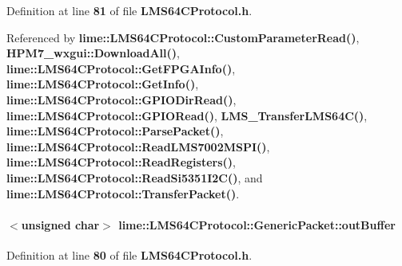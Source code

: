 Definition at line {\bf 81} of file {\bf L\+M\+S64\+C\+Protocol.\+h}.



Referenced by {\bf lime\+::\+L\+M\+S64\+C\+Protocol\+::\+Custom\+Parameter\+Read()}, {\bf H\+P\+M7\+\_\+wxgui\+::\+Download\+All()}, {\bf lime\+::\+L\+M\+S64\+C\+Protocol\+::\+Get\+F\+P\+G\+A\+Info()}, {\bf lime\+::\+L\+M\+S64\+C\+Protocol\+::\+Get\+Info()}, {\bf lime\+::\+L\+M\+S64\+C\+Protocol\+::\+G\+P\+I\+O\+Dir\+Read()}, {\bf lime\+::\+L\+M\+S64\+C\+Protocol\+::\+G\+P\+I\+O\+Read()}, {\bf L\+M\+S\+\_\+\+Transfer\+L\+M\+S64\+C()}, {\bf lime\+::\+L\+M\+S64\+C\+Protocol\+::\+Parse\+Packet()}, {\bf lime\+::\+L\+M\+S64\+C\+Protocol\+::\+Read\+L\+M\+S7002\+M\+S\+P\+I()}, {\bf lime\+::\+L\+M\+S64\+C\+Protocol\+::\+Read\+Registers()}, {\bf lime\+::\+L\+M\+S64\+C\+Protocol\+::\+Read\+Si5351\+I2\+C()}, and {\bf lime\+::\+L\+M\+S64\+C\+Protocol\+::\+Transfer\+Packet()}.

\paragraph[{out\+Buffer}]{$<$unsigned char$>$ lime\+::\+L\+M\+S64\+C\+Protocol\+::\+Generic\+Packet\+::out\+Buffer}\label{structlime_1_1LMS64CProtocol_1_1GenericPacket_a1b05b10e3b4958723ece76c47ac5b777}


Definition at line {\bf 80} of file {\bf L\+M\+S64\+C\+Protocol.\+h}.



